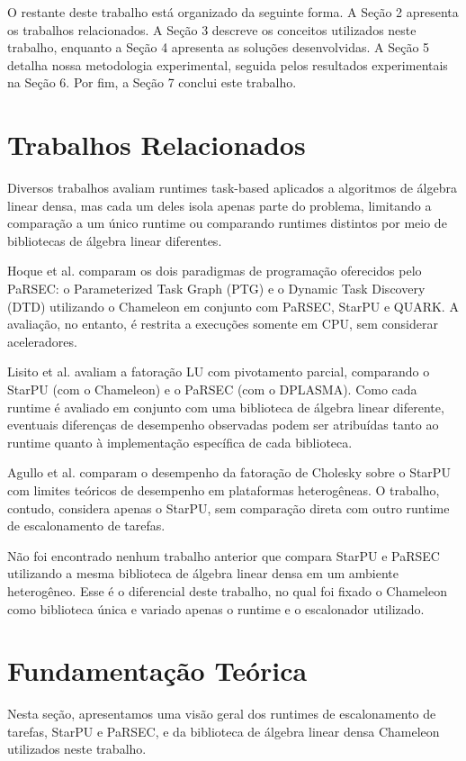 \documentclass[12pt]{article}
\begin{document}
O restante deste trabalho está organizado da seguinte forma. A Seção 2 apresenta os trabalhos relacionados. A Seção 3 descreve os conceitos utilizados neste trabalho, enquanto a Seção 4 apresenta as soluções desenvolvidas. A Seção 5 detalha nossa metodologia experimental, seguida pelos resultados experimentais na Seção 6. Por fim, a Seção 7 conclui este trabalho.

\section{Trabalhos Relacionados}

Diversos trabalhos avaliam runtimes task-based aplicados a algoritmos de álgebra linear densa, mas cada um deles isola apenas parte do problema, limitando a comparação a um único runtime ou comparando runtimes distintos por meio de bibliotecas de álgebra linear diferentes.

Hoque et al. \cite{10.1145/3148226.3148233} comparam os dois paradigmas de programação oferecidos pelo PaRSEC: o Parameterized Task Graph (PTG) e o Dynamic Task Discovery (DTD) utilizando o Chameleon em conjunto com PaRSEC, StarPU e QUARK. A avaliação, no entanto, é restrita a execuções somente em CPU, sem considerar aceleradores.

Lisito et al. \cite{11078555} avaliam a fatoração LU com pivotamento parcial, comparando o StarPU (com o Chameleon) e o PaRSEC (com o DPLASMA). Como cada runtime é avaliado em conjunto com uma biblioteca de álgebra linear diferente, eventuais diferenças de desempenho observadas podem ser atribuídas tanto ao runtime quanto à implementação específica de cada biblioteca.

Agullo et al. \cite{7284288} comparam o desempenho da fatoração de Cholesky sobre o StarPU com limites teóricos de desempenho em plataformas heterogêneas. O trabalho, contudo, considera apenas o StarPU, sem comparação direta com outro runtime de escalonamento de tarefas.

Não foi encontrado nenhum trabalho anterior que compara StarPU e PaRSEC utilizando a mesma biblioteca de álgebra linear densa em um ambiente heterogêneo. Esse é o diferencial deste trabalho, no qual foi fixado o Chameleon como biblioteca única e variado apenas o runtime e o escalonador utilizado.

\section{Fundamentação Teórica}
Nesta seção, apresentamos uma visão geral dos runtimes de escalonamento de tarefas, StarPU e PaRSEC, e da biblioteca de álgebra linear densa Chameleon utilizados neste trabalho.
\end{document}
